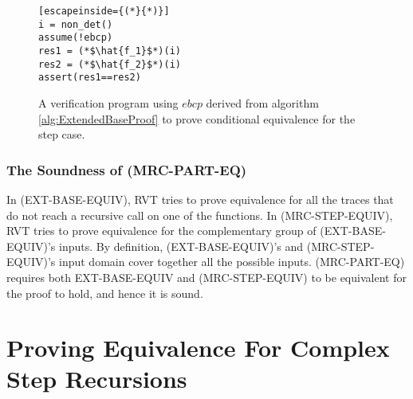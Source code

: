 \begin{figure} [h]
\begin{center}
\begin{minipage}{7 cm}
\begin{lstlisting}[escapeinside={(*}{*)}]
i = non_det()
assume(!ebcp)
res1 = (*$\hat{f_1}$*)(i)
res2 = (*$\hat{f_2}$*)(i)
assert(res1==res2)
\end{lstlisting}
\end{minipage}
\caption{A verification program using $ebcp$ derived from algorithm \ref{alg:ExtendedBaseProof} to prove conditional equivalence for the step case.}
\label{fig:stepvefprogram}
\end{center}
\end{figure}

\subsubsection{The Soundness of (MRC-PART-EQ)}
\label{sec:MRCsoundness}
In (EXT-BASE-EQUIV), RVT tries to prove equivalence for all the traces that do not reach a recursive call on one of the functions. In (MRC-STEP-EQUIV), RVT tries to prove equivalence for the complementary group of (EXT-BASE-EQUIV)'s inputs. By definition, (EXT-BASE-EQUIV)'s and (MRC-STEP-EQUIV)'s input domain cover together all the possible inputs. (MRC-PART-EQ) requires both EXT-BASE-EQUIV and (MRC-STEP-EQUIV) to be equivalent for the proof to hold, and hence it is sound.


\section{Proving Equivalence For Complex Step Recursions}
\label{sec:multistep}
